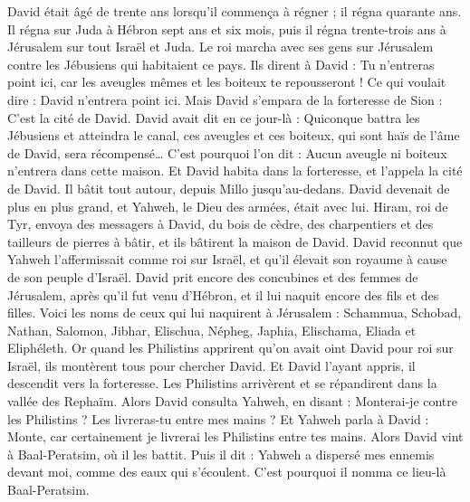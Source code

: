 \begin{multicols}{2}
David était âgé de trente ans lorsqu’il commença à régner ; il régna quarante ans.
Il régna sur Juda à Hébron sept ans et six mois, puis il régna trente-trois ans à Jérusalem sur tout Israël et Juda.
Le roi marcha avec ses gens sur Jérusalem contre les Jébusiens qui habitaient ce pays. Ils dirent à David : Tu n'entreras point ici, car les aveugles mêmes et les boiteux te repousseront ! Ce qui voulait dire : David n'entrera point ici.
Mais David s’empara de la forteresse de Sion : C’est la cité de David.
David avait dit en ce jour-là : Quiconque battra les Jébusiens et atteindra le canal, ces aveugles et ces boiteux, qui sont haïs de l’âme de David, sera récompensé… C'est pourquoi l’on dit : Aucun aveugle ni boiteux n'entrera dans cette maison.
Et David habita dans la forteresse, et l'appela la cité de David. Il bâtit tout autour, depuis Millo jusqu'au-dedans.
David devenait de plus en plus grand, et Yahweh, le Dieu des armées, était avec lui.
Hiram, roi de Tyr, envoya des messagers à David, du bois de cèdre, des charpentiers et des tailleurs de pierres à bâtir, et ils bâtirent la maison de David.
David reconnut que Yahweh l'affermissait comme roi sur Israël, et qu'il élevait son royaume à cause de son peuple d'Israël.
David prit encore des concubines et des femmes de Jérusalem, après qu'il fut venu d'Hébron, et il lui naquit encore des fils et des filles.
Voici les noms de ceux qui lui naquirent à Jérusalem : Schammua, Schobad, Nathan, Salomon,
Jibhar, Elischua, Népheg, Japhia,
Elischama, Eliada et Eliphéleth.
Or quand les Philistins apprirent qu'on avait oint David pour roi sur Israël, ils montèrent tous pour chercher David. Et David l’ayant appris, il descendit vers la forteresse.
Les Philistins arrivèrent et se répandirent dans la vallée des Rephaïm.
Alors David consulta Yahweh, en disant : Monterai-je contre les Philistins ? Les livreras-tu entre mes mains ? Et Yahweh parla à David : Monte, car certainement je livrerai les Philistins entre tes mains.
Alors David vint à Baal-Peratsim, où il les battit. Puis il dit : Yahweh a dispersé mes ennemis devant moi, comme des eaux qui s’écoulent. C'est pourquoi il nomma ce lieu-là Baal-Peratsim.

\end{multicols}
